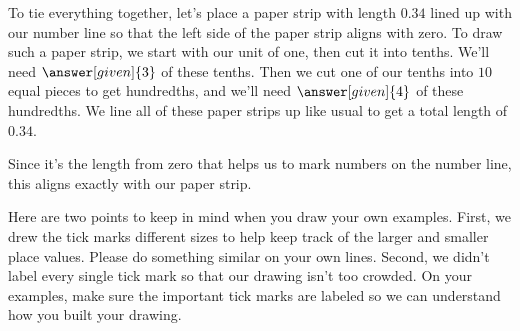 \documentclass{ximera}
\begin{document}
\begin{example}
To tie everything together, let's place a paper strip with length $0.34$ lined up with our number line so that the left side of the paper strip aligns with zero. To draw such a paper strip, we start with our unit of one, then cut it into tenths. We'll need $\answer[given]{3}$ of these tenths. Then we cut one of our tenths into $10$ equal pieces to get hundredths, and we'll need $\answer[given]{4}$ of these hundredths. We line all of these paper strips up like usual to get a total length of $0.34$.

\begin{image}
\end{image}
Since it's the length from zero that helps us to mark numbers on the number line, this aligns exactly with our paper strip.

\end{example}

Here are two points to keep in mind when you draw your own examples. First, we drew the tick marks different sizes to help keep track of the larger and smaller place values. Please do something similar on your own lines. Second, we didn't label every single tick mark so that our drawing isn't too crowded. On your examples, make sure the important tick marks are labeled so we can understand how you built your drawing.
\end{document}
